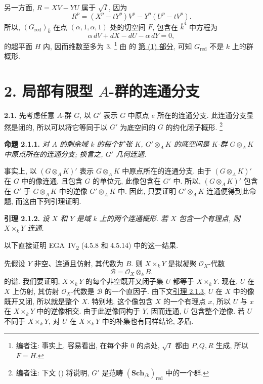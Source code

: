 \begin{enumerate}
另一方面, \(R=XV-YU\) 属于 \(\sqrt I\), 因为
\[
  R^p=(X^p-tY^p)V^p-Y^p(U^p-tV^p).
\]
所以, \((G_{\mathrm{red}})_{\overline k}\) 在点
\((\alpha,1,\alpha,1)\) 处的切空间 \(F\),
包含在 \(\overline k^4\) 中方程为
\[
  \alpha\,dV+dX-dU-\alpha\,dY=0,
\]
的超平面 \(H\) 内, 因而维数至多为 \(3\).%
\footnote{\label{note:sga3-VIA-16}编者注: 事实上, 容易看出,
在每个非 \(0\) 的点处, \(\sqrt I\) 都由 \(P,Q,R\) 生成,
所以 \(F=H\).}
由  的
\hyperref[concl:sga3-VIA-1.3.1-1]{第 (1) 部分},
可知 \(G_{\mathrm{red}}\) 不是 \(k\) 上的群概形.
\end{enumerate}

\section*{2. 局部有限型 \(A\)-群的连通分支}
\label{sec:sga3-VIA-2}

\medskip
{}\label{par:sga3-VIA-2.1}%
\noindent\textbf{2.1.}
先考虑任意 \(A\)-群 \(G\), 以 \(G'\) 表示 \(G\)
中原点 \(e\) 所在的连通分支.
此连通分支显然是闭的,
所以可以将它等同于以 \(G'\) 为底空间的 \(G\) 的约化闭子概形.%
\footnote{\label{note:sga3-VIA-17}编者注:
下文 () 将说明,
\(G'\) 是范畴 \((\mathbf{Sch}_{/k})_{\mathrm{red}}\) 中的一个群.}

\medskip
{}\label{prop:sga3-VIA-2.1.1}%
\noindent\textbf{命题 2.1.1.}
\textit{对 \(A\) 的剩余域 \(k\) 的每个扩张 \(K\),
\(G'\otimes_AK\) 的底空间是 \(K\)-群 \(G\otimes_AK\)
中原点所在的连通分支; 换言之, \(G'\) 几何连通.}

\medskip
事实上, 以 \((G\otimes_AK)'\) 表示 \(G\otimes_AK\)
中原点所在的连通分支.
由于 \((G\otimes_AK)'\) 在 \(G\) 中的像连通,
且包含 \(G\) 的单位元, 此像包含在 \(G'\) 中.
所以, \((G\otimes_AK)'\) 包含在 \(G'\) 于
\(G\otimes_AK\) 中的逆像 \(G'\otimes_AK\) 中.
因此, 只要证明 \(G'\otimes_AK\) 连通便得到此命题,
而这由下列引理证明.

\medskip
{}\label{lem:sga3-VIA-2.1.2}%
\noindent\textbf{引理 2.1.2.}
\textit{设 \(X\) 和 \(Y\) 是域 \(k\) 上的两个连通概形.
若 \(X\) 包含一个有理点, 则 \(X\times_kY\) 连通.}

\medskip
以下直接证明 EGA~IV\textsubscript{2} (4.5.8 和 4.5.14) 中的这一结果.

先假设 \(Y\) 非空、连通且仿射, 其代数为 \(B\).
则 \(X\times_kY\) 是拟凝聚 \(\mathcal O_X\)-代数
\[
  \mathcal B=\mathcal O_X\otimes_kB.
\]
的谱. 我们要证明, \(X\times_kY\) 的每个非空既开又闭子集
\(U\) 都等于 \(X\times_kY\).
现在, \(U\) 在 \(X\) 上仿射,
其仿射 \(\mathcal O_X\)-代数是 \(\mathcal B\) 的一个直因子.
由下文\hyperref[lem:sga3-VIA-2.1.3]{引理 2.1.3},
\(U\) 在 \(X\) 中的像既开又闭, 所以就是整个 \(X\).
特别地, 这个像包含 \(X\) 的一个有理点 \(x\),
所以 \(U\) 与 \(x\) 在 \(X\times_kY\) 中的逆像相交.
由于此逆像同构于 \(Y\), 因而连通,
\(U\) 包含整个逆像.
若 \(U\) 不同于 \(X\times_kY\),
对 \(U\) 在 \(X\times_kY\) 中的补集也有同样结论, 矛盾.

